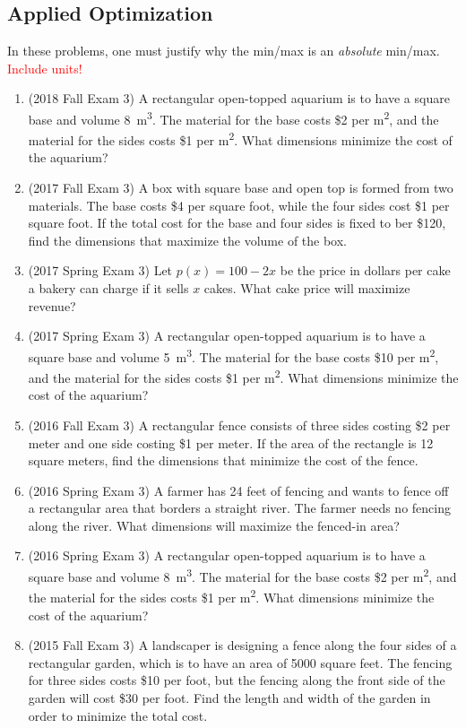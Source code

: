 \documentclass[10pt]{scrartcl}
\begin{document}
\subsection{Applied Optimization}
In these problems, one must justify why the min/max is an \emph{absolute} min/max.\\
\textcolor{red}{Include units!}

\begin{enumerate}
\item (2018 Fall Exam 3) A rectangular open-topped aquarium is to have a square base and volume \SI{8}{m^3}. The material for the base costs \$2 per \si{m^2}, and the material for the sides costs \$1 per \si{m^2}. What dimensions minimize the cost of the aquarium?
\item (2017 Fall Exam 3) A box with square base and open top is formed from two materials. The base costs \$4 per square foot, while the four sides cost \$1 per square foot. If the total cost for the base and four sides is fixed to ber \$120, find the dimensions that maximize the volume of the box.
\item (2017 Spring Exam 3) Let $p(x) = 100 - 2x$ be the price in dollars per cake a bakery can charge if it sells $x$ cakes. What cake price will maximize revenue?
\item (2017 Spring Exam 3) A rectangular open-topped aquarium is to have a square base and volume \SI{5}{m^3}. The material for the base costs \$10 per \si{m^2}, and the material for the sides costs \$1 per \si{m^2}. What dimensions minimize the cost of the aquarium?
\item (2016 Fall Exam 3) A rectangular fence consists of three sides costing \$2 per meter and one side costing \$1 per meter. If the area of the rectangle is 12 square meters, find the dimensions that minimize the cost of the fence.
\item (2016 Spring Exam 3) A farmer has 24 feet of fencing and wants to fence off a rectangular area that borders a straight river. The farmer needs no fencing along the river. What dimensions will maximize the fenced-in area?
\item (2016 Spring Exam 3) A rectangular open-topped aquarium is to have a square base and volume \SI{8}{m^3}. The material for the base costs \$2 per \si{m^2}, and the material for the sides costs \$1 per \si{m^2}. What dimensions minimize the cost of the aquarium?
\item (2015 Fall Exam 3) A landscaper is designing a fence along the four sides of a rectangular garden, which is to have an area of 5000 square feet. The fencing for three sides costs \$10 per foot, but the fencing along the front side of the garden will cost \$30 per foot. Find the length and width of the garden in order to minimize the total cost.

\end{enumerate}
\end{document}
